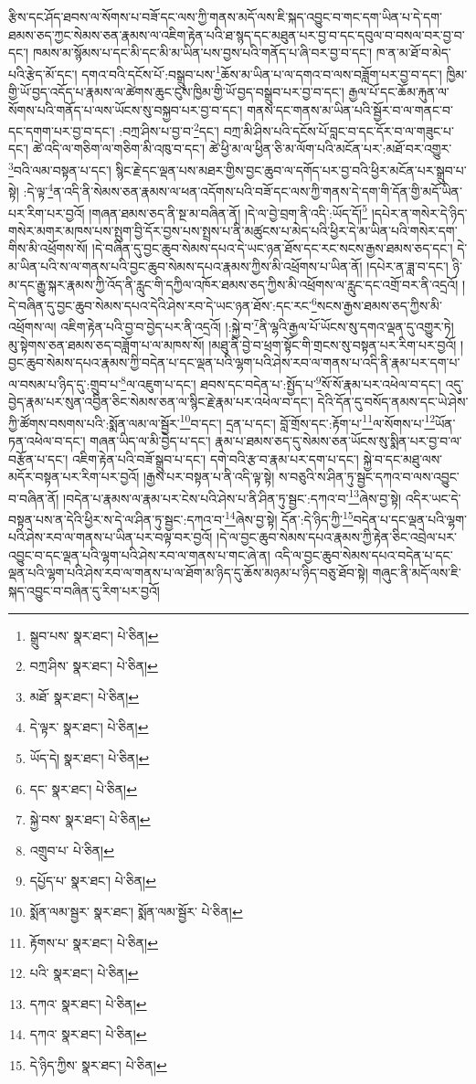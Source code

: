 རྩིས་དང་ཤོད་ཐབས་ལ་སོགས་པ་བཟོ་དང་ལས་ཀྱི་གནས་མདོ་ལས་ཇི་སྐད་འབྱུང་བ་གང་དག་ཡིན་པ་དེ་དག་ཐམས་ཅད་ཀྱང་སེམས་ཅན་རྣམས་ལ་འཇིག་རྟེན་པའི་ཐ་སྙད་དང་མཐུན་པར་བྱ་བ་དང་དབུལ་བ་བསལ་བར་བྱ་བ་དང་། ཁམས་མ་སྙོམས་པ་དང་མི་དང་མི་མ་ཡིན་པས་བྱས་པའི་གནོད་པ་ཞི་བར་བྱ་བ་དང་། ཁ་ན་མ་ཐོ་བ་མེད་པའི་རྩེད་མོ་དང་། དགའ་བའི་དངོས་པོ་:བསྒྲུབ་པས་\footnote{སྒྲུབ་པས་  སྣར་ཐང་།  པེ་ཅིན། }ཆོས་མ་ཡིན་པ་ལ་དགའ་བ་ལས་བཟློག་པར་བྱ་བ་དང་། ཁྱིམ་གྱི་ཡོ་བྱད་འདོད་པ་རྣམས་ལ་ཚེགས་ཆུང་ངུས་ཁྱིམ་གྱི་ཡོ་བྱད་བསྒྲུབ་པར་བྱ་བ་དང་། རྒྱལ་པོ་དང་ཆོམ་རྐུན་ལ་སོགས་པའི་གནོད་པ་ལས་ཡོངས་སུ་བསྐྱབ་པར་བྱ་བ་དང་། གནས་དང་གནས་མ་ཡིན་པའི་སྦྱོར་བ་ལ་གནང་བ་དང་དགག་པར་བྱ་བ་དང་། :བཀྲ་ཤིས་པ་བྱ་བ་\footnote{བཀྲ་ཤིས་  སྣར་ཐང་།  པེ་ཅིན། }དང་། བཀྲ་མི་ཤིས་པའི་དངོས་པོ་བླང་བ་དང་དོར་བ་ལ་གཟུང་པ་དང་། ཚེ་འདི་ལ་གཅིག་ལ་གཅིག་མི་འཁུ་བ་དང་། ཚེ་ཕྱི་མ་ལ་ཕྱིན་ཅི་མ་ལོག་པའི་མངོན་པར་:མཐོ་བར་འགྱུར་\footnote{མཐོ་  སྣར་ཐང་།  པེ་ཅིན། }བའི་ལམ་བསྟན་པ་དང་། སྙིང་རྗེ་དང་ལྡན་པས་མཐར་གྱིས་བྱང་ཆུབ་ལ་དགོད་པར་བྱ་བའི་ཕྱིར་མངོན་པར་སྒྲུབ་པ་སྟེ། :དེ་ལྟ་\footnote{དེ་ལྟར་  སྣར་ཐང་།  པེ་ཅིན། }ན་འདི་ནི་སེམས་ཅན་རྣམས་ལ་ཕན་འདོགས་པའི་བཟོ་དང་ལས་ཀྱི་གནས་དེ་དག་གི་དོན་གྱི་མདོ་ཡིན་པར་རིག་པར་བྱའོ། །གཞན་ཐམས་ཅད་ནི་སྔ་མ་བཞིན་ནོ། །དེ་ལ་བྱེ་བྲག་ནི་འདི་:ཡོད་དོ།\footnote{ཡོད་དེ།  སྣར་ཐང་།  པེ་ཅིན། } །དཔེར་ན་གསེར་དེ་ཉིད་གསེར་མགར་མཁས་པས་སྤུག་བྱི་དོར་བྱས་པས་སྤྲས་པ་ནི་མཚུངས་པ་མེད་པའི་ཕྱིར་དེ་མ་ཡིན་པའི་གསེར་དག་གིས་མི་འཕྲོགས་སོ། །དེ་བཞིན་དུ་བྱང་ཆུབ་སེམས་དཔའ་དེ་ཡང་ཉན་ཐོས་དང་རང་སངས་རྒྱས་ཐམས་ཅད་དང་། དེ་མ་ཡིན་པའི་ས་ལ་གནས་པའི་བྱང་ཆུབ་སེམས་དཔའ་རྣམས་ཀྱིས་མི་འཕྲོགས་པ་ཡིན་ནོ། །དཔེར་ན་ཟླ་བ་དང་། ཉི་མ་དང་རྒྱུ་སྐར་རྣམས་ཀྱི་འོད་ནི་རླུང་གི་དཀྱིལ་འཁོར་ཐམས་ཅད་ཀྱིས་མི་འཕྲོགས་ལ་རླུང་དང་འགྲོ་བར་ནི་འདྲའོ། །དེ་བཞིན་དུ་བྱང་ཆུབ་སེམས་དཔའ་དེའི་ཤེས་རབ་དེ་ཡང་ཉན་ཐོས་:དང་རང་\footnote{དང་  སྣར་ཐང་།  པེ་ཅིན། }སངས་རྒྱས་ཐམས་ཅད་ཀྱིས་མི་འཕྲོགས་ལ། འཇིག་རྟེན་པའི་བྱ་བ་བྱེད་པར་ནི་འདྲའོ། །:སྐྱེ་བ་\footnote{སྐྱེ་བས་  སྣར་ཐང་།  པེ་ཅིན། }ནི་ལྷའི་རྒྱལ་པོ་ཡོངས་སུ་དགའ་ལྡན་དུ་འགྱུར་ཏེ། མུ་སྟེགས་ཅན་ཐམས་ཅད་བཟློག་པ་ལ་མཁས་སོ། །མཐུ་ནི་བྱེ་བ་ཕྲག་སྟོང་གི་གྲངས་སུ་བསྟན་པར་རིག་པར་བྱའོ། །བྱང་ཆུབ་སེམས་དཔའ་རྣམས་ཀྱི་བདེན་པ་དང་ལྡན་པའི་ལྷག་པའི་ཤེས་རབ་ལ་གནས་པ་འདི་ནི་རྣམ་པར་དག་པ་ལ་བསམ་པ་ཉིད་དུ་:གྲུབ་པ་\footnote{འགྲུབ་པ་  པེ་ཅིན། }ལ་འཇུག་པ་དང་། ཐབས་དང་བདེན་པ་:སྤྱོད་པ་\footnote{དཔྱོད་པ་  སྣར་ཐང་།  པེ་ཅིན། }སོ་སོ་རྣམ་པར་འཕེལ་བ་དང་། འདུ་བྱེད་རྣམ་པར་སུན་འབྱིན་ཅིང་སེམས་ཅན་ལ་སྙིང་རྗེ་རྣམ་པར་འཕེལ་བ་དང་། དེའི་དོན་དུ་བསོད་ནམས་དང་ཡེ་ཤེས་ཀྱི་ཚོགས་བསགས་པའི་:སྨོན་ལམ་ལ་སྦྱོར་\footnote{སྨོན་ལམ་སྦྱར་  སྣར་ཐང་། སྨོན་ལམ་སྦྱོར་  པེ་ཅིན། }བ་དང་། དྲན་པ་དང་། བློ་གྲོས་དང་:རྟོག་པ་\footnote{རྟོགས་པ་  སྣར་ཐང་།  པེ་ཅིན། }ལ་སོགས་པ་\footnote{པའི་  སྣར་ཐང་།  པེ་ཅིན། }ཡོན་ཏན་འཕེལ་བ་དང་། གཞན་ཡིད་ལ་མི་བྱེད་པ་དང་། རྣམ་པ་ཐམས་ཅད་དུ་སེམས་ཅན་ཡོངས་སུ་སྨིན་པར་བྱ་བ་ལ་བརྩོན་པ་དང་། འཇིག་རྟེན་པའི་བཟོ་སྒྲུབ་པ་དང་། དགེ་བའི་རྩ་བ་རྣམ་པར་དག་པ་དང་། སྐྱེ་བ་དང་མཐུ་ལས་མདོར་བསྟན་པར་རིག་པར་བྱའོ། །རྒྱས་པར་བསྟན་པ་ནི་འདི་ལྟ་སྟེ། ས་བཅུའི་ས་ཤིན་ཏུ་སྦྱང་དཀའ་བ་ལས་འབྱུང་བ་བཞིན་ནོ། །བདེན་པ་རྣམས་ལ་རྣམ་པར་ངེས་པའི་ཤེས་པ་ནི་ཤིན་ཏུ་སྦྱང་:དཀའ་བ་\footnote{དཀའ་  སྣར་ཐང་།  པེ་ཅིན། }ཞེས་བྱ་སྟེ། འདིར་ཡང་དེ་བསྟན་པས་ན་དེའི་ཕྱིར་ས་དེ་ལ་ཤིན་ཏུ་སྦྱང་:དཀའ་བ་\footnote{དཀའ་  སྣར་ཐང་།  པེ་ཅིན། }ཞེས་བྱ་སྟེ། དོན་:དེ་ཉིད་ཀྱི་\footnote{དེ་ཉིད་ཀྱིས་  སྣར་ཐང་།  པེ་ཅིན། }བདེན་པ་དང་ལྡན་པའི་ལྷག་པའི་ཤེས་རབ་ལ་གནས་པ་ཡིན་པར་བལྟ་བར་བྱའོ། །དེ་ལ་བྱང་ཆུབ་སེམས་དཔའ་རྣམས་ཀྱི་རྟེན་ཅིང་འབྲེལ་པར་འབྱུང་བ་དང་ལྡན་པའི་ལྷག་པའི་ཤེས་རབ་ལ་གནས་པ་གང་ཞེ་ན། འདི་ལ་བྱང་ཆུབ་སེམས་དཔའ་བདེན་པ་དང་ལྡན་པའི་ལྷག་པའི་ཤེས་རབ་ལ་གནས་པ་ལ་ཐོག་མ་ཉིད་དུ་ཆོས་མཉམ་པ་ཉིད་བཅུ་ཐོབ་སྟེ། གཞུང་ནི་མདོ་ལས་ཇི་སྐད་འབྱུང་བ་བཞིན་དུ་རིག་པར་བྱའོ། 